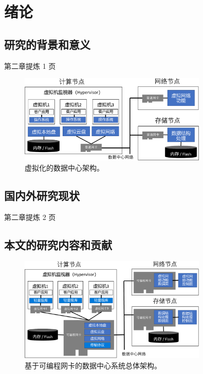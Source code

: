 \chapter{绪论}

\section{研究的背景和意义}



第二章提炼 1 页


\begin{figure}[htbp]
	\centering
	\includegraphics[width=0.8\textwidth]{figures/virt_arch.pdf}
	\caption{虚拟化的数据中心架构。}
	\label{background:fig:virt-architecture}
\end{figure}

\section{国内外研究现状}




第二章提炼 2 页

\section{本文的研究内容和贡献}



\begin{figure}[htbp]
	\centering
	\includegraphics[width=0.8\textwidth]{figures/accel_arch.pdf}
	\caption{基于可编程网卡的数据中心系统总体架构。}
	\label{arch:fig:accel-arch}
\end{figure}

